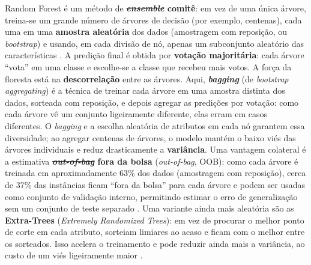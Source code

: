 \documentclass[msc]{on} %
\makeatletter
\providecommand{\DIFaddtex}[1]{{\protect\color{red}#1}} %
\providecommand{\DIFdeltex}[1]{{\protect\color{red}\sout{#1}}} %
\providecommand{\DIFaddbegin}{} %
\providecommand{\DIFaddend}{} %
\providecommand{\DIFdelbegin}{} %
\providecommand{\DIFdelend}{} %
\providecommand{\DIFadd}[1]{\texorpdfstring{\DIFaddtex{#1}}{#1}} %
\providecommand{\DIFdel}[1]{\texorpdfstring{\DIFdeltex{#1}}{}} %
\let\sout@orig\sout %
\renewcommand{\sout}[1]{\ifmmode\text{\sout@orig{\ensuremath{#1}}}\else\sout@orig{#1}\fi} %
\makeatother
\begin{document}
Random Forest \citep{Breiman2001} é um método de \textbf{\DIFdelbegin \textit{\DIFdel{ensemble}}%
\DIFdelend\ifhmode\hskip0pt\fi \DIFaddbegin \DIFadd{comitê}\DIFaddend }: em vez de uma única árvore, treina-se um grande número de árvores de decisão (por exemplo, centenas), cada uma em uma \textbf{amostra aleatória} dos dados (amostragem com reposição, ou \textit{bootstrap}) e usando, em cada divisão de nó, apenas um subconjunto aleatório das características \citep{geron2019maos, Levada2026}. A predição final é obtida por \textbf{votação majoritária}: cada árvore ``vota'' em uma classe e escolhe-se a classe que recebeu mais votos. A força da floresta está na \textbf{descorrelação} entre as árvores. Aqui, \textbf{\textit{bagging}} (de \textit{bootstrap aggregating}) é a técnica de treinar cada árvore em uma amostra distinta dos dados, sorteada com reposição, e depois agregar as predições por votação: como cada árvore vê um conjunto ligeiramente diferente, elas erram em casos diferentes. O \textit{bagging} e a escolha aleatória de atributos em cada nó garantem essa diversidade; ao agregar centenas de árvores, o modelo mantém o baixo viés das árvores individuais e reduz drasticamente a \textbf{variância}. Uma vantagem colateral é a estimativa \textbf{\DIFdelbegin \textit{\DIFdel{out-of-bag}}%
\DIFdelend\ifhmode\hskip0pt\fi \DIFaddbegin \DIFadd{fora da bolsa}\DIFaddend } (\DIFaddbegin \textit{\DIFadd{out-of-bag}}\DIFadd{, }\DIFaddend OOB): como cada árvore é treinada em aproximadamente 63\% dos dados (amostragem com reposição), cerca de 37\% das instâncias ficam ``fora da bolsa'' para cada árvore e podem ser usadas como conjunto de validação interno, permitindo estimar o erro de generalização sem um conjunto de teste separado \citep{geron2019maos}. Uma variante ainda mais aleatória são as \textbf{Extra-Trees} (\textit{Extremely Randomized Trees}): em vez de procurar o melhor ponto de corte em cada atributo, sorteiam limiares ao acaso e ficam com o melhor entre os sorteados. Isso acelera o treinamento e pode reduzir ainda mais a variância, ao custo de um viés ligeiramente maior \citep{geron2019maos}.
\end{document}
